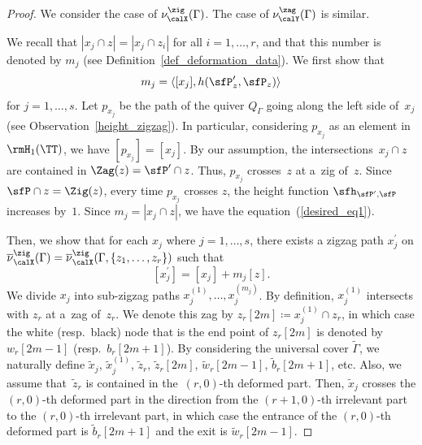 \begin{proof}We consider the case of $\nu^\zig_\calX(\Gamma)$. The case of $\nu^\zag_\calY(\Gamma)$ is similar.

We recall that $|x_j\cap z|=|x_j\cap z_i|$ for all $i=1,\dots,r$, and that this number is denoted by $m_j$ (see Definition~\ref{def_deformation_data}).
We first show that
\begin{equation}\label{desired_eq1}
m_j=\langle [x_j],h(\sfP_z^\prime,\sfP_z)\rangle
\end{equation}
for $j=1,\dots,s$. Let $p_{x_j}$ be the path of the quiver $Q_\Gamma$ going along the left side of~$x_j$ (see Observation~\ref{height_zigzag}).
In particular, considering $p_{x_j}$ as an element in $\rmH_1(\TT)$, we have $[p_{x_j}]=[x_j]$.
By our assumption, the intersections~$x_j\cap z$ are contained in $\Zag(z)=\sfP^\prime\cap z$.
Thus, $p_{x_j}$ crosses~$z$ at a~zig of~$z$.
Since $\sfP\cap z=\Zig(z)$, every time $p_{x_j}$ crosses $z$, the height function $\sfh_{\sfP^\prime,\sfP}$ increases by~$1$.
Since $m_j=|x_j\cap z|$, we have the equation~(\ref{desired_eq1}).

Then, we show that for each $x_j$ where $j=1,\dots,s$, there exists a zigzag path $x^{\prime}_j$ on $\overline{\nu}_\calX^\zig(\Gamma)=\overline{\nu}_\calX^\zig(\Gamma,\{z_1,\dots,z_r\})$ such that
\begin{equation}\label{desired_eq2}
[x^{\prime}_j]=[x_j]+m_j[z].
\end{equation}
We divide $x_j$ into sub-zigzag paths $x_j^{(1)},\dots,x_j^{(m_j)}$. By definition, $x_j^{(1)}$ intersects with $z_r$ at a~zag of~$z_r$.
We denote this zag by $z_r[2m]\coloneqq x_j^{(1)}\cap z_r$, in which case the white (resp.\ black) node that is the end point of $z_r[2m]$ is denoted by $w_r[2m-1]$ (resp.~$b_r[2m+1]$).
By considering the universal cover $\widetilde{\Gamma}$, we naturally define $\widetilde{x}_j$, $\widetilde{x}_j^{(1)}$, $\widetilde{z}_r$, $\widetilde{z}_r[2m]$, $\widetilde{w}_r[2m-1]$, $\widetilde{b}_r[2m+1]$, etc.
Also, we assume that~$\widetilde{z}_r$ is contained in the~$(r,0)$-th deformed part.
Then, $\widetilde{x}_j$ crosses the $(r,0)$-th deformed part in the direction from the $(r+1,0)$-th irrelevant part to the $(r,0)$-th irrelevant part,
in which case the entrance of the $(r,0)$-th deformed part is $\widetilde{b}_r[2m+1]$ and the exit is $\widetilde{w}_r[2m-1]$.


\end{proof}
